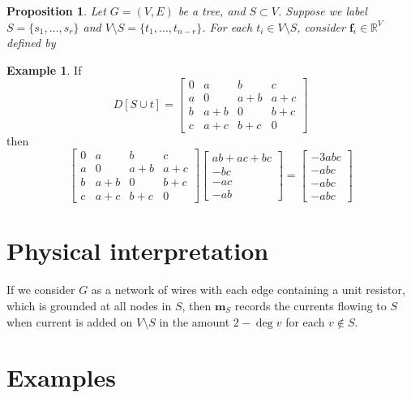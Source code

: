 \documentclass{amsart}
\newtheorem{prop}[thm]{Proposition}
\theoremstyle{definition}
\newtheorem{eg}[thm]{Example}
\newcommand{\RR}{\mathbb{R}}
\begin{document}
\begin{prop}
Let $G = (V,E)$ be a tree, and $S \subset V$.
Suppose we label $S = \{s_1, \ldots, s_r\}$
and $V \setminus S = \{t_1, \ldots, t_{n-r}\}$.
For each $t_i \in V\setminus S$,
consider
$\mathbf{f}_i  \in \RR^V$
defined by
\end{prop}

\begin{eg}
If 
$$
D[S \cup t] = \begin{bmatrix}
0 & a & b & c \\
a & 0 & a + b & a + c \\
b & a + b & 0 & b + c \\
c & a + c & b + c & 0
\end{bmatrix}
$$
then
$$
 \begin{bmatrix}
0 & a & b & c \\
a & 0 & a + b & a + c \\
b & a + b & 0 & b + c \\
c & a + c & b + c & 0
\end{bmatrix}
\begin{bmatrix}
ab + ac + bc \\ -bc \\ -ac \\ -ab 
\end{bmatrix}
= \begin{bmatrix}
-3abc \\ -abc \\ -abc \\ -abc
\end{bmatrix}
$$
\end{eg}

\section{Physical interpretation}

If we consider $G$ as a network of wires with each edge containing a unit resistor,
which is grounded at all nodes in $S$,
then $\mathbf{m}_S$ records the currents flowing to $S$
when current is added on $V\setminus S$ in the amount $2 - \deg v$
for each $v\not\in S$.

\section{Examples}
\end{document}
